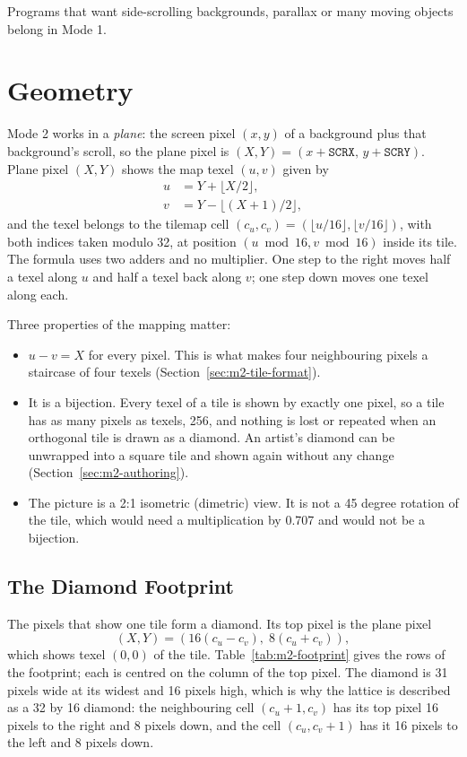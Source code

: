 Programs that want side-scrolling backgrounds, parallax or many moving objects belong in Mode 1.

\section{Geometry}
\label{sec:m2-geometry}

Mode 2 works in a \emph{plane}: the screen pixel $(x, y)$ of a background plus that background's scroll, so the plane
pixel is $(X, Y) = (x + \texttt{SCRX},\, y + \texttt{SCRY})$. Plane pixel $(X, Y)$ shows the map texel $(u, v)$ given
by
\begin{align*}
	u & = Y + \lfloor X / 2 \rfloor,       \\
	v & = Y - \lfloor (X + 1) / 2 \rfloor,
\end{align*}
and the texel belongs to the tilemap cell $(c_u, c_v) = (\lfloor u / 16 \rfloor, \lfloor v / 16 \rfloor)$, with both
indices taken modulo 32, at position $(u \bmod 16, v \bmod 16)$ inside its tile. The formula uses two adders and no
multiplier. One step to the right moves half a texel along $u$ and half a texel back along $v$; one step down moves one
texel along each.

Three properties of the mapping matter:

\begin{itemize}
	\item $u - v = X$ for every pixel. This is what makes four neighbouring pixels a staircase of four texels
	      (Section~\ref{sec:m2-tile-format}).
	\item It is a bijection. Every texel of a tile is shown by exactly one pixel, so a tile has as many pixels as texels, 256,
	      and nothing is lost or repeated when an orthogonal tile is drawn as a diamond. An artist's diamond can be unwrapped
	      into a square tile and shown again without any change (Section~\ref{sec:m2-authoring}).
	\item The picture is a 2:1 isometric (dimetric) view. It is not a 45 degree rotation of the tile, which would need a
	      multiplication by 0.707 and would not be a bijection.
\end{itemize}

\subsection{The Diamond Footprint}

The pixels that show one tile form a diamond. Its top pixel is the plane pixel
\[
	(X, Y) = (16(c_u - c_v),\; 8(c_u + c_v)),
\]
which shows texel $(0, 0)$ of the tile. Table~\ref{tab:m2-footprint} gives the rows of the footprint; each is centred
on the column of the top pixel. The diamond is 31 pixels wide at its widest and 16 pixels high, which is why the
lattice is described as a 32 by 16 diamond: the neighbouring cell $(c_u + 1, c_v)$ has its top pixel 16 pixels to the
right and 8 pixels down, and the cell $(c_u, c_v + 1)$ has it 16 pixels to the left and 8 pixels down.


